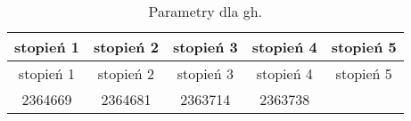 \documentclass[]{article}
\begin{document}
\begin{longtable}[c]{@{}ccccc@{}}
\caption{Parametry dla gh.}\tabularnewline
\toprule
\begin{minipage}[b]{0.14\columnwidth}\centering\strut
stopień 1
\strut\end{minipage} &
\begin{minipage}[b]{0.14\columnwidth}\centering\strut
stopień 2
\strut\end{minipage} &
\begin{minipage}[b]{0.14\columnwidth}\centering\strut
stopień 3
\strut\end{minipage} &
\begin{minipage}[b]{0.14\columnwidth}\centering\strut
stopień 4
\strut\end{minipage} &
\begin{minipage}[b]{0.14\columnwidth}\centering\strut
stopień 5
\strut\end{minipage}\tabularnewline
\midrule
\endfirsthead
\toprule
\begin{minipage}[b]{0.14\columnwidth}\centering\strut
stopień 1
\strut\end{minipage} &
\begin{minipage}[b]{0.14\columnwidth}\centering\strut
stopień 2
\strut\end{minipage} &
\begin{minipage}[b]{0.14\columnwidth}\centering\strut
stopień 3
\strut\end{minipage} &
\begin{minipage}[b]{0.14\columnwidth}\centering\strut
stopień 4
\strut\end{minipage} &
\begin{minipage}[b]{0.14\columnwidth}\centering\strut
stopień 5
\strut\end{minipage}\tabularnewline
\midrule
\endhead
\begin{minipage}[t]{0.14\columnwidth}\centering\strut
2364669
\strut\end{minipage} &
\begin{minipage}[t]{0.14\columnwidth}\centering\strut
2364681
\strut\end{minipage} &
\begin{minipage}[t]{0.14\columnwidth}\centering\strut
2363714
\strut\end{minipage} &
\begin{minipage}[t]{0.14\columnwidth}\centering\strut
2363738
\strut\end{minipage} &
\begin{minipage}[t]{0.14\columnwidth}\centering\strut

\end{minipage}
\end{longtable}
\end{document}
